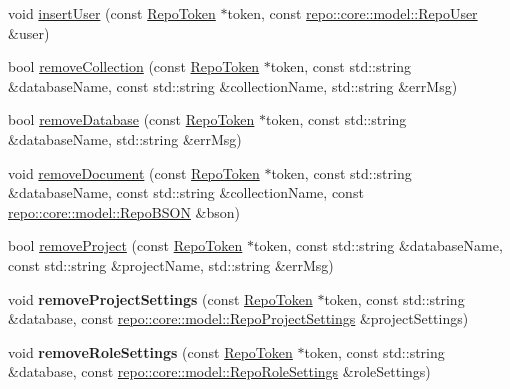 \begin{DoxyCompactItemize}
\item 
void \hyperlink{classrepo_1_1_repo_controller_ad3793dacbaeee7fc9d478e745430db69}{insert\+User} (const \hyperlink{class_repo_controller_1_1_repo_token}{Repo\+Token} $\ast$token, const \hyperlink{classrepo_1_1core_1_1model_1_1_repo_user}{repo\+::core\+::model\+::\+Repo\+User} \&user)
\item 
bool \hyperlink{classrepo_1_1_repo_controller_a1f0ba9ee885b5d48003aeedaceaee243}{remove\+Collection} (const \hyperlink{class_repo_controller_1_1_repo_token}{Repo\+Token} $\ast$token, const std\+::string \&database\+Name, const std\+::string \&collection\+Name, std\+::string \&err\+Msg)
\item 
bool \hyperlink{classrepo_1_1_repo_controller_ac30e6ddffe3125adf0e7284e40a5a269}{remove\+Database} (const \hyperlink{class_repo_controller_1_1_repo_token}{Repo\+Token} $\ast$token, const std\+::string \&database\+Name, std\+::string \&err\+Msg)
\item 
void \hyperlink{classrepo_1_1_repo_controller_a134ad26d3a2935920befac04d20f5b8a}{remove\+Document} (const \hyperlink{class_repo_controller_1_1_repo_token}{Repo\+Token} $\ast$token, const std\+::string \&database\+Name, const std\+::string \&collection\+Name, const \hyperlink{classrepo_1_1core_1_1model_1_1_repo_b_s_o_n}{repo\+::core\+::model\+::\+Repo\+B\+S\+O\+N} \&bson)
\item 
bool \hyperlink{classrepo_1_1_repo_controller_a3851e6f27b80ac0f6e7a01bbbe5f4ab4}{remove\+Project} (const \hyperlink{class_repo_controller_1_1_repo_token}{Repo\+Token} $\ast$token, const std\+::string \&database\+Name, const std\+::string \&project\+Name, std\+::string \&err\+Msg)
\item 
\hypertarget{classrepo_1_1_repo_controller_a6d9edd0929cb86efa10fe4849c862d18}{}void {\bfseries remove\+Project\+Settings} (const \hyperlink{class_repo_controller_1_1_repo_token}{Repo\+Token} $\ast$token, const std\+::string \&database, const \hyperlink{classrepo_1_1core_1_1model_1_1_repo_project_settings}{repo\+::core\+::model\+::\+Repo\+Project\+Settings} \&project\+Settings)\label{classrepo_1_1_repo_controller_a6d9edd0929cb86efa10fe4849c862d18}

\item 
\hypertarget{classrepo_1_1_repo_controller_a084775b4018cc0f4f6fc6a49568decfa}{}void {\bfseries remove\+Role\+Settings} (const \hyperlink{class_repo_controller_1_1_repo_token}{Repo\+Token} $\ast$token, const std\+::string \&database, const \hyperlink{classrepo_1_1core_1_1model_1_1_repo_role_settings}{repo\+::core\+::model\+::\+Repo\+Role\+Settings} \&role\+Settings)\label{classrepo_1_1_repo_controller_a084775b4018cc0f4f6fc6a49568decfa}


\end{DoxyCompactItemize}
